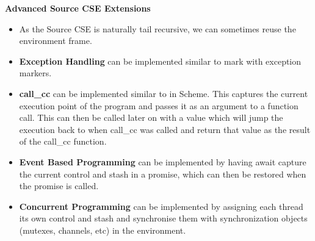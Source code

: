 \begin{center}
     \textbf{Advanced Source CSE Extensions}
\end{center}
\begin{itemize}
    \item As the Source CSE is naturally tail recursive, we can sometimes reuse the environment frame. 
    \item \textbf{Exception Handling} can be implemented similar to mark with exception markers.
    \item \textbf{call\_cc} can be implemented similar to in Scheme. This captures the current execution point of the program and passes it as an argument to a function call. This can then be called later on with a value which will jump the execution back to when call\_cc was called and return that value as the result of the call\_cc function.
    \item \textbf{Event Based Programming} can be implemented by having await capture the current control and stash in a promise, which can then be restored when the promise is called.
    \item \textbf{Concurrent Programming} can be implemented by assigning each thread its own control and stash and synchronise them with synchronization objects (mutexes, channels, etc) in the environment.
\end{itemize}